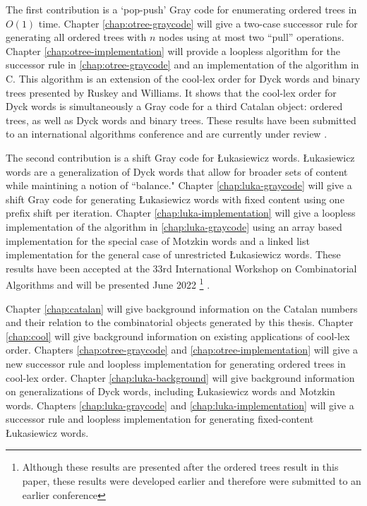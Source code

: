 The first contribution is a `pop-push' Gray code for enumerating ordered trees in $O(1)$ time. Chapter \ref{chap:otree-graycode} will give a two-case successor rule for generating all ordered trees with $n$ nodes using at most two ``pull'' operations. Chapter \ref{chap:otree-implementation} will provide a loopless algorithm for the successor rule in \ref{chap:otree-graycode} and an implementation of the algorithm in C.  This algorithm is an extension of the cool-lex order for Dyck words and binary trees presented by Ruskey and Williams. It shows that the cool-lex order for Dyck words is simultaneously a Gray code for a third Catalan object: ordered trees, as well as Dyck words and binary trees.  These results have been submitted to an international algorithms conference and are currently under review \cite{lapeypush}.

The second contribution is a shift Gray code for Łukasiewicz words.  Łukasiewicz words are a generalization of Dyck words that allow for broader sets of content while maintining a notion of ``balance." Chapter \ref{chap:luka-graycode} will give a shift Gray code for generating Łukasiewicz words with fixed content using one prefix shift per iteration.  Chapter \ref{chap:luka-implementation} will give a loopless implementation of the algorithm in \ref{chap:luka-graycode} using an array based implementation for the special case of Motzkin words and a linked list implementation for the general case of unrestricted Łukasiewicz words.  These results have been accepted at the 33rd International Workshop on Combinatorial Algorithms and will be presented June 2022 \footnote{Although these results are presented after the ordered trees result in this paper, these results were developed earlier and therefore were submitted to an earlier conference} \cite{lapey2022shift}.

Chapter \ref{chap:catalan} will give background information on the Catalan numbers and their relation to the combinatorial objects generated by this thesis.  Chapter \ref{chap:cool} will give background information on existing applications of cool-lex order.  Chapters \ref{chap:otree-graycode} and \ref{chap:otree-implementation} will give a new successor rule and loopless implementation for generating ordered trees in cool-lex order.  Chapter \ref{chap:luka-background} will give background information on generalizations of Dyck words, including Łukasiewicz words and Motzkin words. Chapters \ref{chap:luka-graycode} and \ref{chap:luka-implementation} will give a successor rule and loopless implementation for generating fixed-content Łukasiewicz words.
